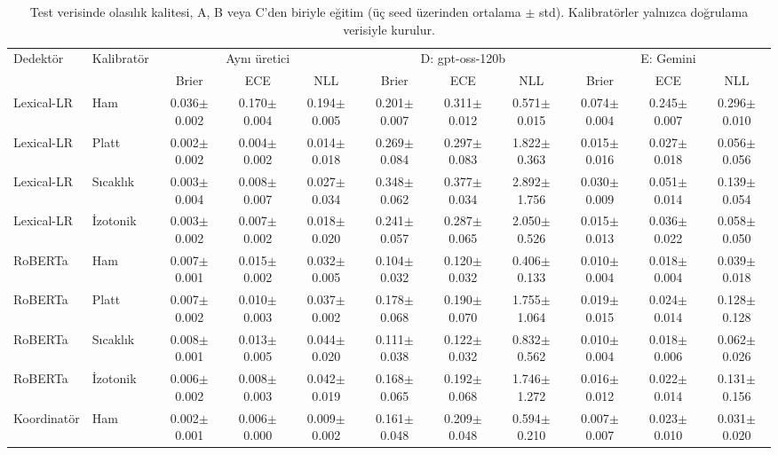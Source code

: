 \begin{table}[t]
\centering
\scriptsize\setlength{\tabcolsep}{2.5pt}
\caption{Test verisinde olasılık kalitesi, A, B veya C'den biriyle eğitim (üç seed üzerinden ortalama $\pm$ std). Kalibratörler yalnızca doğrulama verisiyle kurulur.}
\label{tab:calibration}
\begin{tabular}{@{}ll@{\ }ccccccccc@{}}
\toprule
Dedektör & Kalibratör & \multicolumn{3}{c}{Aynı üretici} & \multicolumn{3}{c}{D: gpt-oss-120b} & \multicolumn{3}{c}{E: Gemini} \\
 & & Brier & ECE & NLL & Brier & ECE & NLL & Brier & ECE & NLL \\
\midrule
Lexical-LR & Ham & 0.036$\pm$0.002 & 0.170$\pm$0.004 & 0.194$\pm$0.005 & 0.201$\pm$0.007 & 0.311$\pm$0.012 & 0.571$\pm$0.015 & 0.074$\pm$0.004 & 0.245$\pm$0.007 & 0.296$\pm$0.010 \\
Lexical-LR & Platt & 0.002$\pm$0.002 & 0.004$\pm$0.002 & 0.014$\pm$0.018 & 0.269$\pm$0.084 & 0.297$\pm$0.083 & 1.822$\pm$0.363 & 0.015$\pm$0.016 & 0.027$\pm$0.018 & 0.056$\pm$0.056 \\
Lexical-LR & Sıcaklık & 0.003$\pm$0.004 & 0.008$\pm$0.007 & 0.027$\pm$0.034 & 0.348$\pm$0.062 & 0.377$\pm$0.034 & 2.892$\pm$1.756 & 0.030$\pm$0.009 & 0.051$\pm$0.014 & 0.139$\pm$0.054 \\
Lexical-LR & İzotonik & 0.003$\pm$0.002 & 0.007$\pm$0.002 & 0.018$\pm$0.020 & 0.241$\pm$0.057 & 0.287$\pm$0.065 & 2.050$\pm$0.526 & 0.015$\pm$0.013 & 0.036$\pm$0.022 & 0.058$\pm$0.050 \\
RoBERTa & Ham & 0.007$\pm$0.001 & 0.015$\pm$0.002 & 0.032$\pm$0.005 & 0.104$\pm$0.032 & 0.120$\pm$0.032 & 0.406$\pm$0.133 & 0.010$\pm$0.004 & 0.018$\pm$0.004 & 0.039$\pm$0.018 \\
RoBERTa & Platt & 0.007$\pm$0.002 & 0.010$\pm$0.003 & 0.037$\pm$0.002 & 0.178$\pm$0.068 & 0.190$\pm$0.070 & 1.755$\pm$1.064 & 0.019$\pm$0.015 & 0.024$\pm$0.014 & 0.128$\pm$0.128 \\
RoBERTa & Sıcaklık & 0.008$\pm$0.001 & 0.013$\pm$0.005 & 0.044$\pm$0.020 & 0.111$\pm$0.038 & 0.122$\pm$0.032 & 0.832$\pm$0.562 & 0.010$\pm$0.004 & 0.018$\pm$0.006 & 0.062$\pm$0.026 \\
RoBERTa & İzotonik & 0.006$\pm$0.002 & 0.008$\pm$0.003 & 0.042$\pm$0.019 & 0.168$\pm$0.065 & 0.192$\pm$0.068 & 1.746$\pm$1.272 & 0.016$\pm$0.012 & 0.022$\pm$0.014 & 0.131$\pm$0.156 \\
Koordinatör & Ham & 0.002$\pm$0.001 & 0.006$\pm$0.000 & 0.009$\pm$0.002 & 0.161$\pm$0.048 & 0.209$\pm$0.048 & 0.594$\pm$0.210 & 0.007$\pm$0.007 & 0.023$\pm$0.010 & 0.031$\pm$0.020 \\

\end{tabular}
\end{table}
